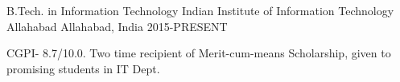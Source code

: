 


\begin{cventries}


\cventry
{B.Tech. in Information Technology} %
{Indian Institute of Information Technology
Allahabad
} %
{Allahabad, India} %
{2015-PRESENT} %
{ %
\begin{cvitems}
\item {CGPI- 8.7/10.0. Two time recipient of Merit-cum-means Scholarship, given to promising students in IT Dept.}
\end{cvitems}
}
\end{cventries}